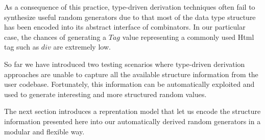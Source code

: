 \documentclass[conference, fleqn]{IEEEtran}
\newcommand{\Conid}[1]{\mathit{#1}}
\newcommand{\Varid}[1]{\mathit{#1}}
\newcommand{\quickcheck}{\emph{QuickCheck}\xspace}
\begin{document}
As a consequence of this practice, type-driven derivation techniques often fail
to synthesize useful random generators due to that most of the data type
structure has been encoded into its abstract interface of combinators.
%
In our particular case, the chances of generating a \ensuremath{\Conid{Tag}} value representing a
commonly used Html tag such as \ensuremath{\Varid{div}} are extremely low.









So far we have introduced two testing scenarios where type-driven derivation
approaches are unable to capture all the available structure information from
the user codebase.
%
Fortunately, this information can be automatically exploited and used to
generate interesting and more structured random values.

The next section introduces a reprentation model that let us encode the
structure information presented here into our automatically derived random
generators in a modular and flexible way.
\end{document}
